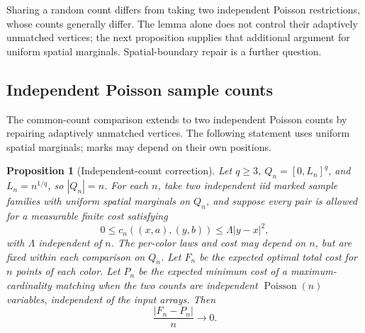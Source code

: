 \documentclass[11pt,reqno]{amsart}
\newtheorem{proposition}[theorem]{Proposition}
\theoremstyle{definition}
\theoremstyle{remark}
\numberwithin{equation}{section}
\begin{document}
Sharing a random count differs from taking two independent Poisson
restrictions, whose counts generally differ. The lemma alone does not
control their adaptively unmatched vertices; the next proposition
supplies that additional argument for uniform spatial marginals.
Spatial-boundary repair is a further question.

\subsection{Independent Poisson sample counts}
\label{subsec:highd-independent-count}

The common-count comparison extends to two independent Poisson
counts by repairing adaptively unmatched vertices. The following
statement uses uniform spatial marginals; marks may depend on their
own positions.

\begin{proposition}[Independent-count correction]
\label{prop:highd-independent-count}
Let \(q\ge3\), \(Q_n=[0,L_n]^q\), and \(L_n=n^{1/q}\), so
\(|Q_n|=n\). For each \(n\), take two independent iid marked
sample families with uniform spatial marginals on \(Q_n\), and
suppose every pair is allowed for a measurable finite cost satisfying
\[
0\le c_n((x,a),(y,b))\le\Lambda|y-x|^2,
\]
with \(\Lambda\) independent of \(n\). The per-color laws and
cost may depend on \(n\), but are fixed within each comparison
on \(Q_n\). Let \(F_n\) be the expected optimal total cost for
\(n\) points of each color. Let \(P_n\) be the expected minimum
cost of a maximum-cardinality matching when the two counts are
independent \(\operatorname{Poisson}(n)\) variables, independent
of the input arrays. Then
\[
\frac{|F_n-P_n|}{n}\longrightarrow0.
\]
\end{proposition}
\end{document}

